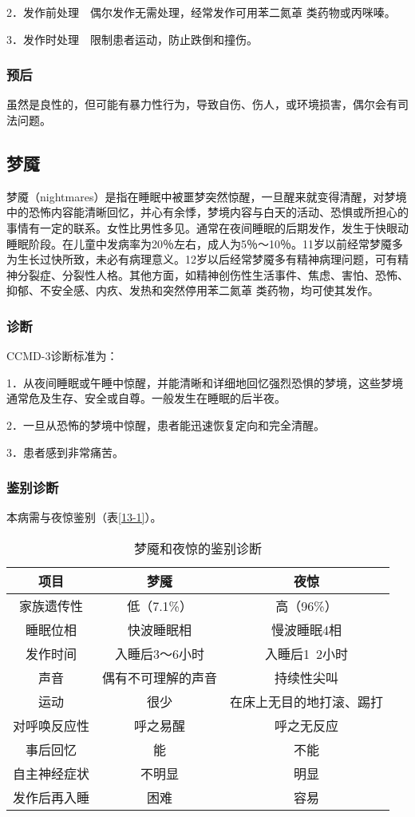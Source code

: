 2．发作前处理　偶尔发作无需处理，经常发作可用苯二氮䓬
类药物或丙咪嗪。

3．发作时处理　限制患者运动，防止跌倒和撞伤。

\subsubsection{预后}

虽然是良性的，但可能有暴力性行为，导致自伤、伤人，或环境损害，偶尔会有司法问题。

\subsection{梦魇}

梦魇（nightmares）是指在睡眠中被噩梦突然惊醒，一旦醒来就变得清醒，对梦境中的恐怖内容能清晰回忆，并心有余悸，梦境内容与白天的活动、恐惧或所担心的事情有一定的联系。女性比男性多见。通常在夜间睡眠的后期发作，发生于快眼动睡眠阶段。在儿童中发病率为20％左右，成人为5％～10％。11岁以前经常梦魇多为生长过快所致，未必有病理意义。12岁以后经常梦魇多有精神病理问题，可有精神分裂症、分裂性人格。其他方面，如精神创伤性生活事件、焦虑、害怕、恐怖、抑郁、不安全感、内疚、发热和突然停用苯二氮䓬
类药物，均可使其发作。

\subsubsection{诊断}

CCMD-3诊断标准为：

1．从夜间睡眠或午睡中惊醒，并能清晰和详细地回忆强烈恐惧的梦境，这些梦境通常危及生存、安全或自尊。一般发生在睡眠的后半夜。

2．一旦从恐怖的梦境中惊醒，患者能迅速恢复定向和完全清醒。

3．患者感到非常痛苦。

\subsubsection{鉴别诊断}

本病需与夜惊鉴别（表\ref{13-1}）。

\begin{table}
\centering
\caption{梦魇和夜惊的鉴别诊断}
\label{tab13-1}
\begin{tabular}{ccc}
\toprule
项目 & 梦魇 & 夜惊\\
\midrule
家族遗传性 & 低（7.1\%） & 高（96\%）  \\
睡眠位相 & 快波睡眠相 & 慢波睡眠4相\\
发作时间 & 入睡后3～6小时 & 入睡后1~2小时\\
声音 & 偶有不可理解的声音 & 持续性尖叫\\
运动 & 很少 & 在床上无目的地打滚、踢打 \\
对呼唤反应性 & 呼之易醒 & 呼之无反应 \\
事后回忆 & 能 & 不能 \\
自主神经症状 & 不明显 & 明显 \\
发作后再入睡 & 困难 & 容易 \\
\bottomrule
\end{tabular}
\end{table}

